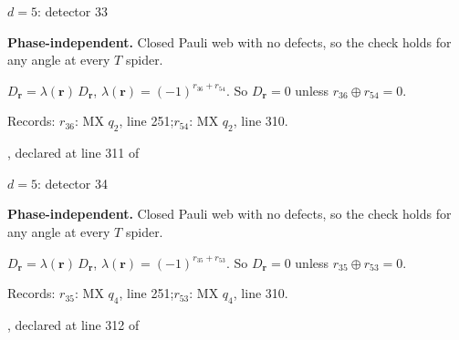 \label{d5_det033}
{\Large $d=5$: detector 33}\par
\textbf{Phase-independent.} Closed Pauli web with no defects, so the check holds for any angle at every $T$ spider.
\begin{center}
\end{center}
\vspace{-1mm}
$D_{\boldsymbol r}=\lambda(\boldsymbol r)\,D_{\boldsymbol r}$, \quad $\lambda(\boldsymbol r)=(-1)^{r_{36}+r_{54}}$. \qquad So $D_{\boldsymbol r}=0$ unless $r_{36}\oplus r_{54}=0$.
\par\smallskip\begin{minipage}{.98\linewidth}\small Records: $r_{36}$: MX $q_{2}$, line 251;\quad $r_{54}$: MX $q_{2}$, line 310.\end{minipage}
\vfill
{\footnotesize\texttt{}, declared at line 311 of \texttt{}}
\newpage

\label{d5_det034}
{\Large $d=5$: detector 34}\par
\textbf{Phase-independent.} Closed Pauli web with no defects, so the check holds for any angle at every $T$ spider.
\begin{center}
\end{center}
\vspace{-1mm}
$D_{\boldsymbol r}=\lambda(\boldsymbol r)\,D_{\boldsymbol r}$, \quad $\lambda(\boldsymbol r)=(-1)^{r_{35}+r_{53}}$. \qquad So $D_{\boldsymbol r}=0$ unless $r_{35}\oplus r_{53}=0$.
\par\smallskip\begin{minipage}{.98\linewidth}\small Records: $r_{35}$: MX $q_{4}$, line 251;\quad $r_{53}$: MX $q_{4}$, line 310.\end{minipage}
\vfill
{\footnotesize\texttt{}, declared at line 312 of \texttt{}}
\newpage

